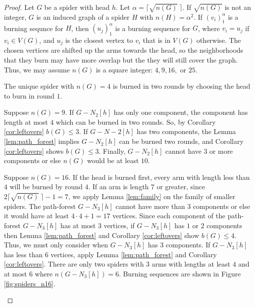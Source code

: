\documentclass[12pt]{article}
\begin{document}
\begin{proof}
    Let $G$ be a spider with head $h$.
    Let $\alpha = \lceil \sqrt{n(G)}\ \rceil$.
    If $\sqrt{n(G)}$ is not an integer, $G$ is an induced graph of a spider $H$ with $n(H) = \alpha^2$.
    If $(v_i)_1^\alpha$ is a burning sequnce for $H$, then $(u_j)_1^\alpha$ is a burning sequence for $G$, where $v_i = u_j$ if $v_i \in V(G)$, and $u_j$ is the closest vertex to $v_i$ that is in $V(G)$ otherwise.
    The chosen vertices are shifted up the arms towards the head, so the neighborhoods that they burn may have more overlap but the they will still cover the graph.
    Thus, we may assume $n(G)$ is a square integer: $4, 9, 16,$ or $25$.
    
    The unique spider with $n(G) = 4$ is burned in two rounds by choosing the head to burn in round $1$.
    
    Suppose $n(G) = 9$.
    If $G - N_2[h]$ has only one component, the component has length at most $4$ which can be burned in two rounds.
    So, by Corollary \ref{cor:leftovers} $b(G) \leq 3$.
    If $G - N-2[h]$ has two components, the Lemma \ref{lem:path_forest} implies $G-N_2[h]$ can be burned two rounds, and Corollary \ref{cor:leftovers} shows $b(G) \leq 3$.
    Finally, $G -N_2[h]$ cannot have $3$ or more components or else $n(G)$ would be at least $10$.

    Suppose $n(G) = 16$.
    If the head is burned first, every arm with length less than $4$ will be burned by round $4$.
    If an arm is length $7$ or greater, since $2\lceil \sqrt{n(G)}\ \rceil - 1 = 7$, we apply Lemma \ref{lem:family} on the family of smaller spiders.
    The path-forest $G - N_3[h]$ cannot have more than $3$ components or else it would have at least $4 \cdot 4 + 1 = 17$ vertices.
    Since each component of the path-forest $G - N_3[h]$ has at most $3$ vertices, if $G-N_3[h]$ has $1$ or $2$ components then Lemma \ref{lem:path_forest} and Corollary \ref{cor:leftovers} show $b(G) \leq 4$.
    Thus, we must only consider when $G-N_3[h]$ has $3$ components.
    If $G-N_3[h]$ has less than $6$ vertices, apply Lemma \ref{lem:path_forest} and Corollary \ref{cor:leftovers}.
    There are only two spiders with $3$ arms with lengths at least $4$ and at most $6$ where $n(G-N_3[h]) = 6$.
    Burning sequences are shown in Figure \ref{fig:spiders_n16}.

    \begin{figure}
        \centering
        \begin{tiny}
\end{tiny}
\end{figure}
\end{proof}
\end{document}
